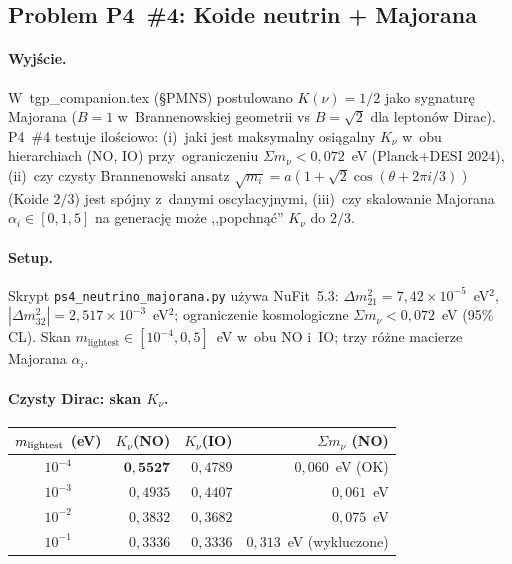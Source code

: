 \subsection{Problem P4~\#4: Koide neutrin + Majorana}%
\label{app:P4-neutrinos}

\paragraph{Wyj\'scie.}
W~tgp\_companion.tex (\S PMNS) postulowano $K(\nu)=1/2$ jako
sygnatur\k{e} Majorana ($B=1$ w~Brannenowskiej geometrii
vs $B=\sqrt{2}$ dla lepton\'ow Dirac).
P4~\#4 testuje ilo\'sciowo: (i)~jaki jest maksymalny osi\k{a}galny
$K_\nu$ w~obu hierarchiach (NO, IO) przy~ograniczeniu $\Sigma m_\nu<0{,}072$~eV
(Planck+DESI 2024), (ii)~czy czysty Brannenowski ansatz
$\sqrt{m_i} = a(1+\sqrt{2}\cos(\theta+2\pi i/3))$ (Koide $2/3$)
jest sp\'ojny z~danymi oscylacyjnymi, (iii)~czy skalowanie Majorana
$\alpha_i \in [0{,}1, 5]$ na generacj\k{e} mo\.ze ,,popchn\k{a}\'c'' $K_\nu$ do $2/3$.

\paragraph{Setup.}
Skrypt \texttt{ps4\_neutrino\_majorana.py} u\.zywa NuFit~5.3:
$\Delta m^2_{21} = 7{,}42\!\times\!10^{-5}$~eV$^2$,
$|\Delta m^2_{32}| = 2{,}517\!\times\!10^{-3}$~eV$^2$;
ograniczenie kosmologiczne $\Sigma m_\nu < 0{,}072$~eV (95\% CL).
Skan $m_\text{lightest} \in [10^{-4}, 0{,}5]$~eV w~obu NO i~IO;
trzy r\'o\.zne macierze Majorana $\alpha_i$.

\paragraph{Czysty Dirac: skan $K_\nu$.}
\begin{center}\footnotesize
\begin{tabular}{@{}crrr@{}}
\toprule
$m_{\rm lightest}$ (eV) & $K_\nu$(NO) & $K_\nu$(IO) & $\Sigma m_\nu$ (NO) \\
\midrule
$10^{-4}$ & $\mathbf{0{,}5527}$ & $0{,}4789$ & $0{,}060$~eV (OK) \\
$10^{-3}$ & $0{,}4935$ & $0{,}4407$ & $0{,}061$~eV \\
$10^{-2}$ & $0{,}3832$ & $0{,}3682$ & $0{,}075$~eV \\
$10^{-1}$ & $0{,}3336$ & $0{,}3336$ & $0{,}313$~eV (wykluczone) \\
\bottomrule
\end{tabular}
\end{center}

